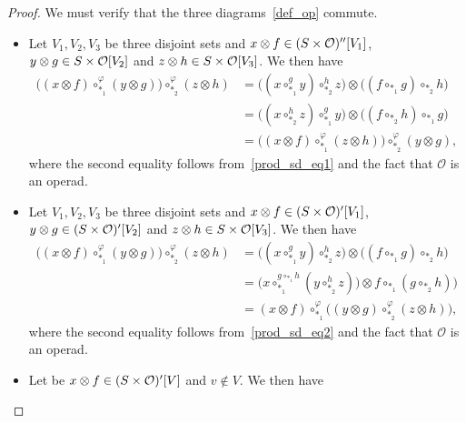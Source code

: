 \documentclass[11pt]{article}
\theoremstyle{definition}
\numberwithin{equation}{section}
\newcommand{\spe}[1]{\normalfont{\textsc{#1}}}
\newcommand{\comp}[1][\ast]{\circ_{#1}}
\newcommand{\Operad}{\mathcal{O}}
\begin{document}
\begin{proof}
    We must verify that the three diagrams~\eqref{def_op} commute.
    \begin{itemize} 
        \item Let $V_1,V_2,V_3$ be three disjoint sets and $x\otimes f\in(\spe{S}\times\Operad)''[V_1]$, 
        $y\otimes g\in\spe{S}\times\Operad[V_2]$ and $z\otimes h\in\spe{S}\times\Operad[V_3]$. We then have
        \begin{equation}\begin{split}
            \big((x\otimes f) \comp[\ast_1]^{\varphi} (y\otimes g)\big)\comp[\ast_2]^{\varphi} (z\otimes h) 
            &= \big( (x \comp[\ast_1]^g y) \comp[\ast_2]^h z \big)  \otimes  \big((f\comp[\ast_1]g)\comp[\ast_2]h \big) \\
            &= \big( (x \comp[\ast_2]^h z) \comp[\ast_1]^g y \big)  \otimes  \big((f\comp[\ast_2]h)\comp[\ast_1]g \big) \\
            &= \big( (x\otimes f) \comp[\ast_1]^{\varphi} (z\otimes h) \big) \comp[\ast_2]^{\varphi} (y\otimes g),
        \end{split}\end{equation}
        where the second equality follows from~\eqref{prod_sd_eq1} and the fact that $\Operad$ is an operad.
        \item Let $V_1,V_2,V_3$ be three disjoint sets and $x\otimes f\in(\spe{S}\times\Operad)'[V_1]$, 
        $y\otimes g\in(\spe{S}\times\Operad)'[V_2]$ and $z\otimes h\in\spe{S}\times\Operad[V_3]$. We then have
        \begin{equation}\begin{split}
            \big((x\otimes f) \comp[\ast_1]^{\varphi} (y\otimes g)\big)\comp[\ast_2]^{\varphi} (z\otimes h) 
            &= \big( (x\comp[\ast_1]^g y)\comp[\ast_2]^h z \big)  \otimes  \big( (f\comp[\ast_1]g)\comp[\ast_2]h \big) \\
            &= \big( x\comp[\ast_1]^{g\comp[\ast_1]h}( y\comp[\ast_2]^h z) \big)  \otimes  f\comp[\ast_1](g\comp[\ast_2]h) \big) \\
            &= (x\otimes f)\comp[\ast_1]^{\varphi}\big( (y\otimes g)\comp[\ast_2]^{\varphi}(z\otimes h)\big),
        \end{split}\end{equation} 
        where the second equality follows from~\eqref{prod_sd_eq2} and the fact that $\Operad$ is an operad.
        \item Let be $x\otimes f\in(\spe{S}\times\Operad)'[V]$ and $v\not\in V$. We then have 

\end{itemize}
\end{proof}
\end{document}
